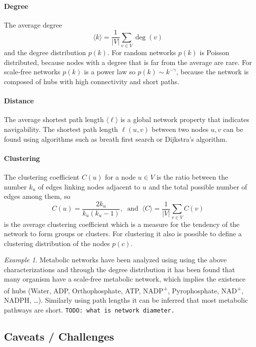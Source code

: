 \documentclass[a4paper]{article}
\newcommand{\todo}[1]{\texttt{TODO: #1}}
\theoremstyle{plain}
\theoremstyle{definition}
\theoremstyle{remark}
\newtheorem*{example}{Example}
\begin{document}
\paragraph{Degree} The average degree
\[
  \langle k \rangle = \frac{1}{|V|} \sum_{v \in V} \deg(v)
\]
and the degree distribution $p(k)$. For random networks $p(k)$ is Poisson
distributed, because nodes with a degree that is far from the average are
rare. For scale-free networks $p(k)$ is a power law so $p(k) \sim
k^{-\gamma}$, because the network is composed of hubs with high connectivity
and short paths.

\paragraph{Distance} The average shortest path length $\langle \ell \rangle$
is a global network property that indicates navigability. The shortest path
length $\ell(u,v)$ between two nodes $u,v$ can be found using algorithms such
as breath first search or Dijkstra's algorithm.

\paragraph{Clustering} The clustering coefficient $C(u)$ for a node $u \in V$
is the ratio between the number $k_u$ of edges linking nodes adjacent to $u$
and the total possible number of edges among them, so
\[
  C(u) = \frac{2 k_u}{k_u(k_u - 1)},
  ~\text{ and }~
  \langle C \rangle = \frac{1}{|V|} \sum_{v \in V} C(v)
\]
is the average clustering coefficient which is a measure for the tendency of
the network to form groups or clusters. For clustering it also is possible to
define a clustering distribution of the nodes $p(c)$.

\begin{example}
  Metabolic networks have been analyzed using using the above
  characterizations and through the degree distribution it has been found that
  many organism have a scale-free metabolic network, which implies the
  existence of hubs (Water, ADP, Orthophosphate, ATP, NADP\textsuperscript{+},
  Pyrophosphate, NAD\textsuperscript{+}, NADPH, \ldots). Similarly using path
  lengths it can be inferred that most metabolic pathways are short.
  \todo{what is network diameter.}
\end{example}

\subsection{Caveats / Challenges}
\end{document}

